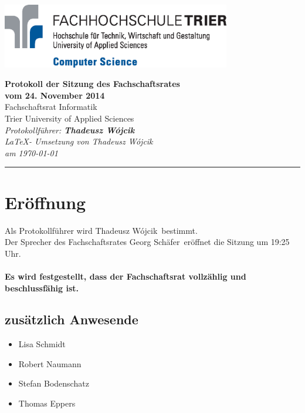 \documentclass[a4paper, 11pt]{article} %
\newcommand{\protokoller}{Thadeusz W{\'o}jcik}
\newcommand{\dateOfMeeting}{24. November 2014}
\newcommand{\TeXer}{Thadeusz W{\'o}jcik}
\newcommand{\fsiPresident}{Georg Schäfer}
\begin{document}

\doublespacing
\thispagestyle{empty}

\begin{center}
\includegraphics[width=10.0cm]{../logo_faculty_computer_science.eps}

\vspace*{\fill}
{\LARGE \textbf{Protokoll der Sitzung des Fachschaftsrates \\vom \dateOfMeeting}}\\
Fachschaftsrat Informatik\\
Trier University of Applied Sciences\\
\vspace{2.5cm}
\textit{
	Protokollführer: \textbf{\protokoller} \\
	\LaTeX - Umsetzung von \TeXer\\
	am \today
}
\vfill
\end{center}

\hspace*{-35cm}
\textcolor{fsi}{\rule{64.9cm}{15pt}}
\pagebreak
 
\setcounter{tocdepth}{2}
\tableofcontents 
\pagebreak

\section{Eröffnung}
Als Protokollführer wird \protokoller~bestimmt.\\
Der Sprecher des Fachschaftsrates \fsiPresident~eröffnet die Sitzung um 19:25 Uhr.
\\\\
\textbf{Es wird festgestellt, dass der Fachschaftsrat vollzählig und beschlussfähig ist.}
\subsection{zusätzlich Anwesende}
\begin{itemize}
	\item Lisa Schmidt
	\item Robert Naumann
	\item Stefan Bodenschatz
	\item Thomas Eppers
\end{itemize}
\end{document}
